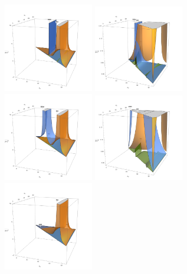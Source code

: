 \begin{figure}[ht]
    \centering
    \includegraphics[width=0.35\textwidth]{chapters/RelatedWorks/sectionBSM/figures/2HDM_120_10.png}
    \includegraphics[width=0.35\textwidth]{chapters/RelatedWorks/sectionBSM/figures/zoom_2HDM_140_10.png}
    \includegraphics[width=0.35\textwidth]{chapters/RelatedWorks/sectionBSM/figures/2HDM_140_40.png}
    \includegraphics[width=0.35\textwidth]{chapters/RelatedWorks/sectionBSM/figures/zoom_2HDM_140_40.png}
    \includegraphics[width=0.35\textwidth]{chapters/RelatedWorks/sectionBSM/figures/2HDM_200_40.png}

\end{figure}
